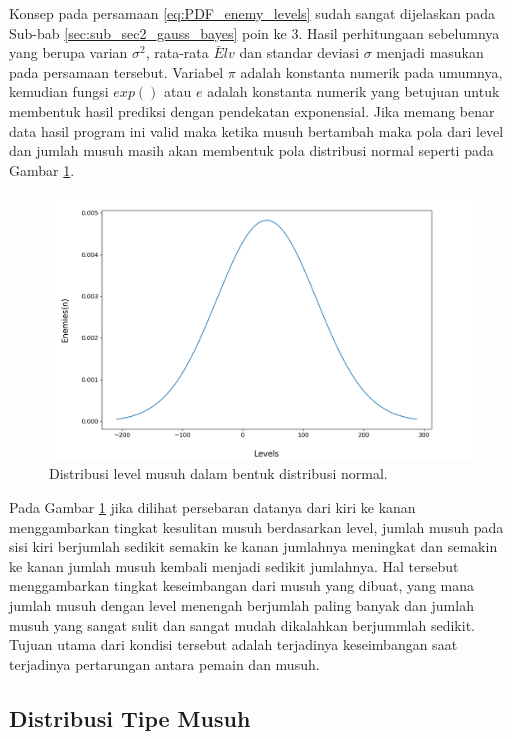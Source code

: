 Konsep pada persamaan \ref{eq:PDF_enemy_levels} sudah sangat dijelaskan pada Sub-bab \ref{sec:sub_sec2_gauss_bayes} poin ke 3. Hasil perhitungaan sebelumnya yang berupa varian $\sigma^2$, rata-rata $\bar{E}lv$ dan standar deviasi $\sigma$ menjadi masukan pada persamaan tersebut. Variabel $\pi$ adalah konstanta numerik pada umumnya, kemudian fungsi $exp()$ atau $e$ adalah konstanta numerik yang betujuan untuk membentuk hasil prediksi dengan pendekatan exponensial. Jika memang benar data hasil program ini valid maka ketika musuh bertambah maka pola dari level dan jumlah musuh masih akan membentuk pola distribusi normal seperti pada Gambar \ref{fig:enemy_level_distrib_ndist}.

\begin{figure} [!h] \centering
	\includegraphics[scale=0.5]{img/EnemyLevelDistribNdist.png}
	\caption{Distribusi level musuh dalam bentuk distribusi normal.}
	\label{fig:enemy_level_distrib_ndist}
\end{figure}

Pada Gambar \ref{fig:enemy_level_distrib_ndist} jika dilihat persebaran datanya dari kiri ke kanan menggambarkan tingkat kesulitan musuh berdasarkan level, jumlah musuh pada sisi kiri berjumlah sedikit semakin ke kanan jumlahnya meningkat dan semakin ke kanan jumlah musuh kembali menjadi sedikit jumlahnya. Hal tersebut menggambarkan tingkat keseimbangan dari musuh yang dibuat, yang mana jumlah musuh dengan level menengah berjumlah paling banyak dan jumlah musuh yang sangat sulit dan sangat mudah dikalahkan berjummlah sedikit. Tujuan utama dari kondisi tersebut adalah terjadinya keseimbangan saat terjadinya pertarungan antara pemain dan musuh.
\vspace{1ex}

\subsection{Distribusi Tipe Musuh}
\label{sec:sub_sec3_enemy_type}
\vspace{1ex}

